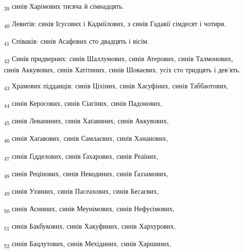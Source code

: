 \begin{tcolorbox}
\textsubscript{39} синів Харімових тисяча й сімнадцять.
\end{tcolorbox}
\begin{tcolorbox}
\textsubscript{40} Левитів: синів Ісусових і Кадміїлових, з синів Гадавії сімдесят і чотири.
\end{tcolorbox}
\begin{tcolorbox}
\textsubscript{41} Співаків: синів Асафових сто двадцять і вісім.
\end{tcolorbox}
\begin{tcolorbox}
\textsubscript{42} Синів придверних: синів Шаллумових, синів Атерових, синів Талмонових, синів Аккувових, синів Хатітиних, синів Шоваєвих, усіх сто тридцять і дев'ять.
\end{tcolorbox}
\begin{tcolorbox}
\textsubscript{43} Храмових підданців: синів Ціхіних, синів Хасуфіних, синів Таббаотових,
\end{tcolorbox}
\begin{tcolorbox}
\textsubscript{44} синів Керосових, синів Сіагіних, синів Падонових,
\end{tcolorbox}
\begin{tcolorbox}
\textsubscript{45} синів Леваниних, синів Хаґавиних, синів Аккувових,
\end{tcolorbox}
\begin{tcolorbox}
\textsubscript{46} синів Хаґавових, синів Самлаєвих, синів Хананових,
\end{tcolorbox}
\begin{tcolorbox}
\textsubscript{47} синів Ґідделових, синів Ґахарових, синів Реаїних,
\end{tcolorbox}
\begin{tcolorbox}
\textsubscript{48} синів Рецінових, синів Некодиних, синів Ґаззамових,
\end{tcolorbox}
\begin{tcolorbox}
\textsubscript{49} синів Уззиних, синів Пасеахових, синів Бесаєвих,
\end{tcolorbox}
\begin{tcolorbox}
\textsubscript{50} синів Асниних, синів Меунімових, синів Нефусімових,
\end{tcolorbox}
\begin{tcolorbox}
\textsubscript{51} синів Бакбукових, синів Хакуфиних, синів Хархурових,
\end{tcolorbox}
\begin{tcolorbox}
\textsubscript{52} синів Бацлутових, синів Мехідиних, синів Харшиних,
\end{tcolorbox}
